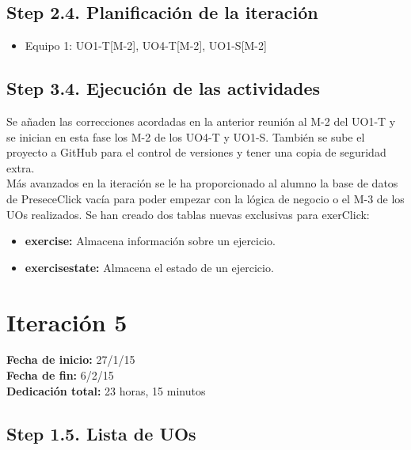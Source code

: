 \subsection{Step 2.4. Planificación de la iteración}
\label{it4:2.4}

\begin{itemize}
\item Equipo 1: UO1-T[M-2], UO4-T[M-2], UO1-S[M-2]
\end{itemize}

\subsection{Step 3.4. Ejecución de las actividades}
\label{it4:3.4}

Se añaden las correcciones acordadas en la anterior reunión al M-2 del UO1-T y se inician en esta fase los M-2 de los UO4-T y UO1-S. También se sube el proyecto a GitHub para el control de versiones y tener una copia de seguridad extra.\\

Más avanzados en la iteración se le ha proporcionado al alumno la base de datos de PreseceClick vacía para poder empezar con la lógica de negocio o el M-3 de los UOs realizados. Se han creado dos tablas nuevas exclusivas para exerClick:

\begin{itemize}
\item \textbf{exercise:} Almacena información sobre un ejercicio.
\item \textbf{exercisestate:} Almacena el estado de un ejercicio.
\end{itemize}


\section{Iteración 5}
\label{it5}

\begin{flushleft}
\textbf{Fecha de inicio:} 27/1/15\\
\textbf{Fecha de fin:} 6/2/15\\
\textbf{Dedicación total:} 23 horas, 15 minutos\\
\end{flushleft}

\subsection{Step 1.5. Lista de UOs}
\label{it5:1.5}

